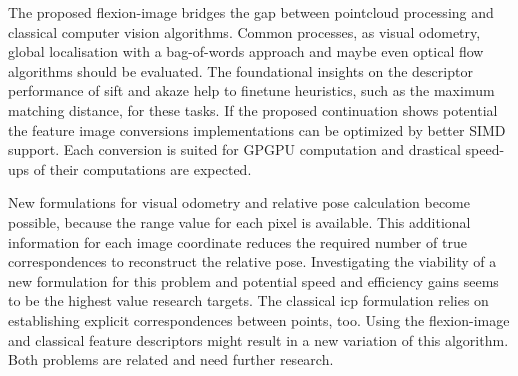 The proposed \gls{flexion-image} bridges the gap between pointcloud processing and classical computer vision algorithms.
Common processes, as visual odometry, global localisation with a bag-of-words approach and maybe even optical flow algorithms should be evaluated.
The foundational insights on the descriptor performance of \acrshort{sift} and \acrshort{akaze} help to finetune heuristics, such as the maximum matching distance, for these tasks.
If the proposed continuation shows potential the feature image conversions implementations can be optimized by better \acrshort{SIMD} support.
Each conversion is suited for GPGPU computation and drastical speed-ups of their computations are expected.

New formulations for visual odometry and relative pose calculation become possible, because the range value for each pixel is available.
This additional information for each image coordinate reduces the required number of true correspondences to reconstruct the relative pose.
Investigating the viability of a new formulation for this problem and potential speed and efficiency gains seems to be the highest value research targets.
The classical \acrshort{icp} formulation relies on establishing explicit correspondences between points, too.
Using the \gls{flexion-image} and classical feature descriptors might result in a new variation of this algorithm.
Both problems are related and need further research.
